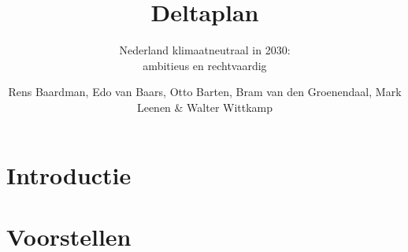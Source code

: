 \documentclass[DIV=calc]{scrbook}
\title{Deltaplan}
\subtitle{Nederland klimaatneutraal in 2030:\\ambitieus en rechtvaardig}
\author{Rens Baardman, Edo van Baars, Otto Barten, Bram van den Groenendaal, Mark Leenen \& Walter Wittkamp}
\begin{document}




\tableofcontents

\part{Introductie}
% 

% 
% 


\part{Voorstellen}


\end{document}
